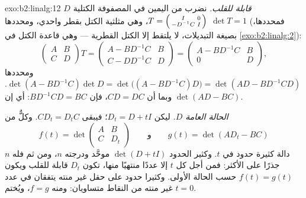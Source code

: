 \begin{solution}{exo:b2:linalg:12}
\emph{$D$ قابلة للقلب.} نضرب من اليمين في المصفوفة الكتلية
$T = \begin{psmallmatrix} I & 0\\ -D^{-1}C & I\end{psmallmatrix}$،
وهي مثلثية الكتل بقطر واحدي، ومحددها $\det T = 1$ (فمحددها،
بصيغة التبديلات، لا يلتقط إلا الكتل
القطرية --- وهي قاعدة الكتل في \cref{exo:b2:linalg:2}):
\[
\begin{pmatrix} A & B\\ C & D\end{pmatrix} T
= \begin{pmatrix} A - BD^{-1}C & B\\ C - DD^{-1}C & D\end{pmatrix}
= \begin{pmatrix} A - BD^{-1}C & B\\ 0 & D\end{pmatrix},
\]
ومحددها $\det(A - BD^{-1}C)\det D = \det\bigl((A -
BD^{-1}C)D\bigr) = \det(AD - BD^{-1}CD)$. وبما أن $CD = DC$، فإن
$BD^{-1}CD = BC$: أي إن  $\det(AD - BC)$.

\emph{الحالة العامة $D$.} ليكن $D_t = D + tI$؛ فيبقى $CD_t = D_tC$.
وكلٌّ من
\[
f(t) = \det\begin{pmatrix} A & B\\ C & D_t\end{pmatrix}
\qquad\text{و}\qquad
g(t) = \det(AD_t - BC)
\]
دالة كثيرة حدود في $t$. وكثير الحدود $\det(D + tI)$
موحَّد ودرجته $n$، ومن ثم فله $n$ جذرًا على الأكثر: فمن أجل كل
$t$ إلا عددًا منتهيًا منها، تكون $D_t$ قابلة للقلب ويكون $f(t) = g(t)$ حسب
الحالة الأولى. وكثيرا حدود على حقل غير منته يتفقان في
عدد غير منته من النقاط متساويان: ومنه $f = g$، ويُختم $t = 0$.
\end{solution}

